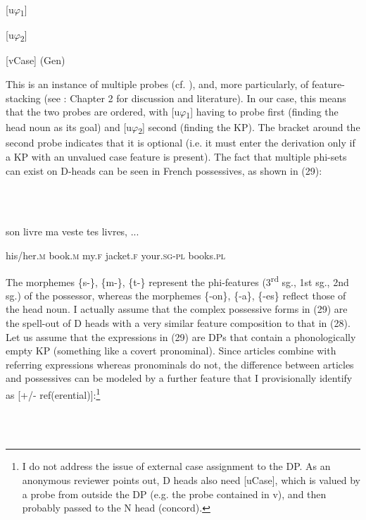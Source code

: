 \documentclass[output=paper]{langsci/langscibook}
\begin{document}
\ea%
    \label{ex:key:28}
    \gll\\
        \\
    \glt
    \z

            [u$\varphi $\textsubscript{1}]

    [u$\varphi $\textsubscript{2}]

          [vCase] (Gen)

This is an instance of multiple probes (cf. \citealt{Chomsky2008}), and, more particularly, of feature-stacking (see \citealt{Manetta2011}: Chapter 2 for discussion and literature). In our case, this means that the two probes are ordered, with [u$\varphi $\textsubscript{1}] having to probe first (finding the head noun as its goal) and [u$\varphi $\textsubscript{2}] second (finding the KP). The bracket around the second probe indicates that it is optional (i.e. it must enter the derivation only if a KP with an unvalued case feature is present). The fact that multiple phi-sets can exist on D-heads can be seen in French possessives, as shown in (29):

\ea%
    \label{ex:key:29}
    \gll\\
        \\
    \glt
    \z

          son    livre    ma  veste    tes    livres, ...

  his/her.\textsc{m}  book.\textsc{m}  my.\textsc{f}  jacket.\textsc{f}  your.\textsc{sg-pl}  books.\textsc{pl}

The morphemes \{s-\}, \{m-\}, \{t-\} represent the phi-features (3\textsuperscript{rd} sg., 1st sg., 2nd sg.) of the possessor, whereas the morphemes \{-on\}, \{-a\}, \{-es\} reflect those of the head noun. I actually assume that the complex possessive forms in (29) are the spell-out of D heads with a very similar feature composition to that in (28). Let us assume that the expressions in (29) are DPs that contain a phonologically empty KP (something like a covert pronominal). Since articles combine with referring expressions whereas pronominals do not, the difference between articles and possessives can be modeled by a further feature that I provisionally identify as [+/- ref(erential)]:\footnote{I do not address the issue of external case assignment to the DP. As an anonymous reviewer points out, D heads also need [uCase], which is valued by a probe from outside the DP (e.g. the probe contained in v), and then probably passed to the N head (concord).}

\ea%
    \label{ex:key:30}
    \gll\\
        \\
    \glt
    \z
\end{document}
